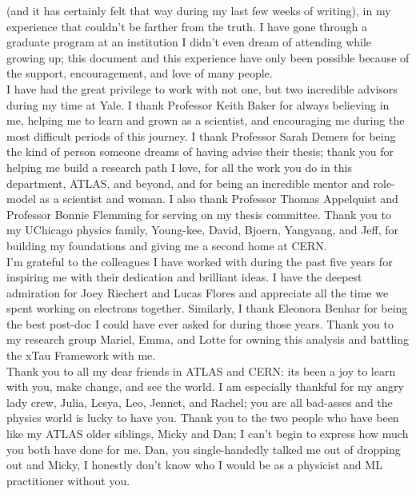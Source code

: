 
 (and it has certainly felt that way during my last few weeks of writing), in my experience that couldn't be farther from the truth. I have gone through a graduate program at an institution I didn't even dream of attending while growing up; this document and this experience have only been possible because of the support, encouragement, and love of many people.\\

I have had the great privilege to work with not one, but two incredible advisors during my time at Yale. I thank Professor Keith Baker for always believing in me, helping me to learn and grown as a scientist, and encouraging me during the most difficult periods of this journey. I thank Professor Sarah Demers for being the kind of person someone dreams of having advise their thesis; thank you for helping me build a research path I love, for all the work you do in this department, ATLAS, and beyond, and for being an incredible mentor and role-model as a scientist and woman. I also thank Professor Thomas Appelquist and Professor Bonnie Flemming for serving on my thesis committee. Thank you to my UChicago physics family, Young-kee, David, Bjoern, Yangyang, and Jeff, for building my foundations and giving me a second home at CERN.\\

I'm grateful to the colleagues I have worked with during the past five years for inspiring me with their dedication and brilliant ideas. I have the deepest admiration for Joey Riechert and Lucas Flores and appreciate all the time we spent working on electrons together. Similarly, I thank Eleonora Benhar for being the best post-doc I could have ever asked for during those years. Thank you to my research group Mariel, Emma, and Lotte for owning this analysis and battling the xTau Framework with me.\\

Thank you to all my dear friends in ATLAS and CERN: its been a joy to learn with you, make change, and see the world. I am especially thankful for my angry lady crew, Julia, Lesya, Leo, Jennet, and Rachel; you are all bad-asses and the physics world is lucky to have you. Thank you to the two people who have been like my ATLAS older siblings, Micky and Dan; I can't begin to express how much you both have done for me. Dan, you single-handedly talked me out of dropping out and Micky, I honestly don't know who I would be as a physicist and ML practitioner without you.


